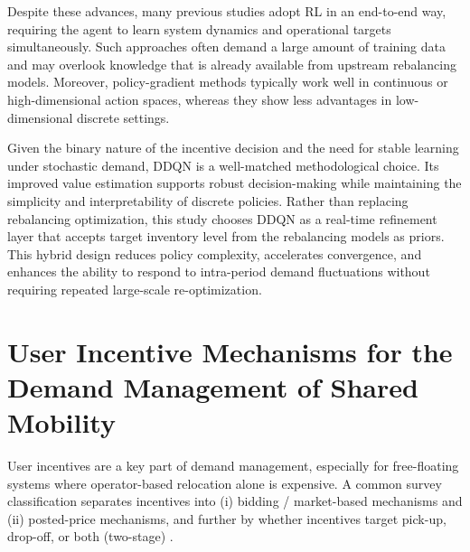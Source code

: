 Despite these advances, many previous studies adopt RL in an end-to-end way, requiring the agent to learn system dynamics and operational targets simultaneously. Such approaches often demand a large amount of training data and may overlook knowledge that is already available from upstream rebalancing models. Moreover, policy-gradient methods typically work well in continuous or high-dimensional action spaces, whereas they show less advantages in low-dimensional discrete settings.

Given the binary nature of the incentive decision and the need for stable learning under stochastic demand, DDQN is a well-matched methodological choice. Its improved value estimation supports robust decision-making while maintaining the simplicity and interpretability of discrete policies. Rather than replacing rebalancing optimization, this study chooses DDQN as a real-time refinement layer that accepts target inventory level from the rebalancing models as priors. This hybrid design reduces policy complexity, accelerates convergence, and enhances the ability to respond to intra-period demand fluctuations without requiring repeated large-scale re-optimization.

\section{User Incentive Mechanisms for the Demand Management of Shared Mobility}

User incentives are a key part of demand management, especially for free-floating systems where operator-based relocation alone is expensive. A common survey classification separates incentives into (i) bidding / market-based mechanisms and (ii) posted-price mechanisms, and further by whether incentives target pick-up, drop-off, or both (two-stage) \parencite{gao2025uncertainties}.

